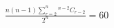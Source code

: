 \documentclass[preview]{standalone}
\begin{document}
\begin{align*}
\frac{n(n-1) \sum_{r=2}^n {}^{n-2}C_{r-2}}{2^n} = 60
\end{align*}
\end{document}
